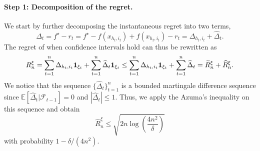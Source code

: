 \paragraph{Step 1: Decomposition of the regret.}
We start by further decomposing the instantaneous regret into two terms,
\[
\Delta_t = f^\star - r_t = f^\star - f(x_{h_t,i_t}) + f(x_{h_t,i_t}) - r_t = \Delta_{h_t,i_t} + \hat{\Delta}_t.
\]
The regret of \HCT when confidence intervals hold can thus be rewritten as
\begin{equation} \label{eq2}
R_n^{\xi} = \sum_{t=1}^n \Delta_{h_t,i_t} {\bf 1}_{\xi_t} + \sum_{t=1}^n \widehat{\Delta}_t {\bf 1}_{\xi_t} \leq \sum_{t=1}^n \Delta_{h_t,i_t} {\bf 1}_{\xi_t} + \sum_{t=1}^n \widehat{\Delta}_t = \widetilde{R}_n^{\xi} + \widehat{R}_n^{\xi}.
\end{equation}
We notice that the sequence $\{\hat{\Delta}_t\}_{t=1}^n$ is a bounded martingale difference sequence since $\mathbb{E}\left[\hat{\Delta}_t|\mathcal{F}_{t-1}\right]=0$ and $|\hat{\Delta}_t|\leq 1$. Thus, we apply the Azuma's inequality on this sequence and obtain
\begin{equation} \label{eq3}
\hat{R}_n^{\xi} \leq \sqrt{2n\operatorname{log}\left(\frac{4n^2}{\delta}\right)}
\end{equation}
with probability $1-\delta/(4n^2)$.


